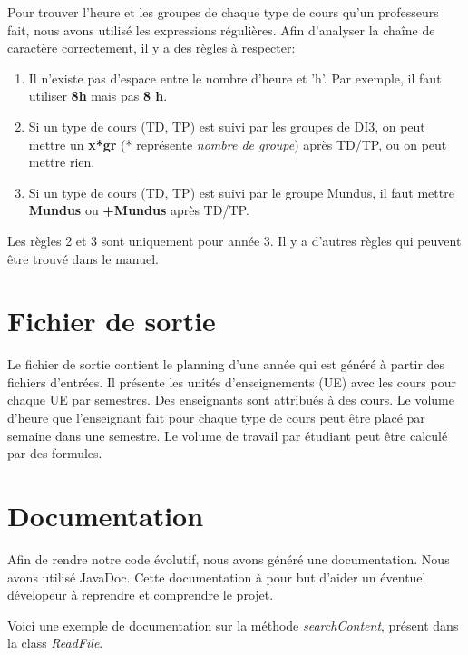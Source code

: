 \documentclass{polytech/polytech}
\begin{document}
	Pour trouver l'heure et les groupes de chaque type de cours qu'un professeurs fait, nous avons utilisé les expressions régulières.
	Afin d'analyser la chaîne de caractère correctement, il y a des règles à respecter:

	\begin{enumerate}
		\item Il n'existe pas d'espace entre le nombre d'heure et 'h'. Par exemple, il faut utiliser \textbf{8h} mais pas \textbf{8 h}.

		\item Si un type de cours (TD, TP) est suivi par les groupes de DI3, on peut mettre un \textbf{x*gr} (* représente \textit{nombre de groupe}) après
		TD/TP, ou on peut mettre rien.

		\item Si un type de cours (TD, TP) est suivi par le groupe Mundus, il faut mettre \textbf{Mundus} ou \textbf{+Mundus} après TD/TP.

	\end{enumerate}

	Les règles 2 et 3 sont uniquement pour année 3.
	Il y a d'autres règles qui peuvent être trouvé dans le manuel.

	\section{Fichier de sortie}

	Le fichier de sortie contient le planning d'une année qui est généré à partir des fichiers d'entrées.
	Il présente les unités d'enseignements (UE) avec les cours pour chaque UE par semestres.
	Des enseignants sont attribués à des cours. Le volume d'heure que l'enseignant fait pour chaque type de cours peut être placé par semaine dans une semestre.
	Le volume de travail par étudiant peut être calculé par des formules.

	\section{Documentation}
	Afin de rendre notre code évolutif, nous avons généré une documentation.
	Nous avons utilisé JavaDoc.
	Cette documentation à pour but d'aider un éventuel dévelopeur à reprendre et comprendre le projet.

	Voici une exemple de documentation sur la méthode \textit{searchContent}, présent dans la class \textit{ReadFile}.
\end{document}
